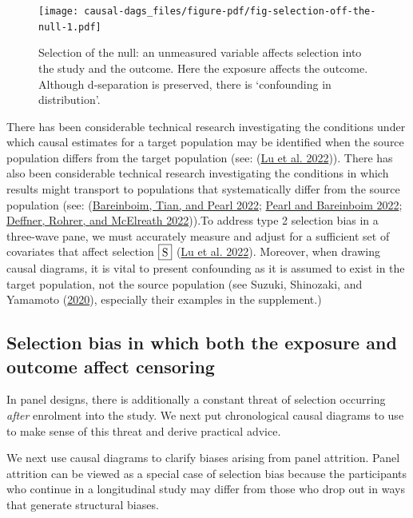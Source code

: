 \documentclass[
  singlecolumn]{report}
\begin{document}
\begin{figure}

{\centering \texttt{[image: causal-dags\_files/figure-pdf/fig-selection-off-the-null-1.pdf]}

}

\caption{\label{fig-selection-off-the-null}Selection of the null: an
unmeasured variable affects selection into the study and the outcome.
Here the exposure affects the outcome. Although d-separation is
preserved, there is `confounding in distribution'.}

\end{figure}

There has been considerable technical research investigating the
conditions under which causal estimates for a target population may be
identified when the source population differs from the target population
(see: (\protect\hyperlink{ref-lu2022}{Lu et al. 2022})). There has also
been considerable technical research investigating the conditions in
which results might transport to populations that systematically differ
from the source population (see:
(\protect\hyperlink{ref-bareinboim2022}{Bareinboim, Tian, and Pearl
2022}; \protect\hyperlink{ref-pearl2022}{Pearl and Bareinboim 2022};
\protect\hyperlink{ref-deffner2022}{Deffner, Rohrer, and McElreath
2022})).To address type 2 selection bias in a three-wave pane, we must
accurately measure and adjust for a sufficient set of covariates that
affect selection \(\framebox{S}\) (\protect\hyperlink{ref-lu2022}{Lu et
al. 2022}). Moreover, when drawing causal diagrams, it is vital to
present confounding as it is assumed to exist in the target population,
not the source population (see Suzuki, Shinozaki, and Yamamoto
(\protect\hyperlink{ref-suzuki2020}{2020}), especially their examples in
the supplement.)

\hypertarget{selection-bias-in-which-both-the-exposure-and-outcome-affect-censoring}{%
\subsection{Selection bias in which both the exposure and outcome affect
censoring}\label{selection-bias-in-which-both-the-exposure-and-outcome-affect-censoring}}

In panel designs, there is additionally a constant threat of selection
occurring \emph{after} enrolment into the study. We next put
chronological causal diagrams to use to make sense of this threat and
derive practical advice.

We next use causal diagrams to clarify biases arising from panel
attrition. Panel attrition can be viewed as a special case of selection
bias because the participants who continue in a longitudinal study may
differ from those who drop out in ways that generate structural biases.
\end{document}
